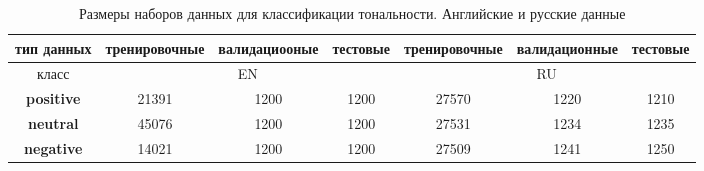 \begin{table}[t]
\caption{Размеры наборов данных для классификации тональности. Английские и русские данные}
\label{sentiment_sizes_tr-ag}
\begin{tabular}{|c||c|c|c|c|c|c|} \hline
{тип данных} & {тренировочные} & {валидациооные} & {тестовые} & {тренировочные} & {валидационные} & {тестовые} \\ \hline
{класс} & \multicolumn{3}{c|}{EN} & \multicolumn{3}{c|}{RU} \\ \hline \hline
\hline
  \textbf{positive}& 21391 & 1200 & 1200 & 27570 & 1220 & 1210\\ \hline
  \textbf{neutral}&45076 & 1200& 1200& 27531 & 1234 & 1235 \\ \hline
  \textbf{negative}& 14021 & 1200 & 1200 & 27509 & 1241 & 1250\\ \hline
\end{tabular}
\end{table}


